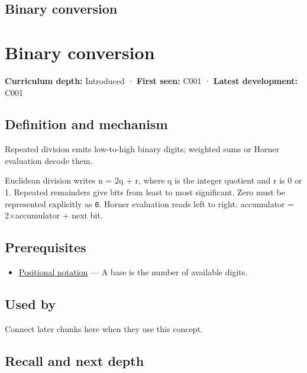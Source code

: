 \hypertarget{appendix-dc552784a2c0}{}
\section*{Binary conversion}
\chapter{Binary conversion}\label{appendix-dc552784a2c0-binary-conversion}

\textbf{Curriculum depth:} Introduced · \textbf{First seen:} C001 · \textbf{Latest development:} C001

\section{Definition and mechanism}\label{appendix-dc552784a2c0-definition-and-mechanism}

Repeated division emits low-to-high binary digits; weighted sums or Horner evaluation decode them.

Euclidean division writes n = 2q + r, where q is the integer quotient and r is 0 or 1. Repeated remainders give bits from least to most significant. Zero must be represented explicitly as \texttt{0}. Horner evaluation reads left to right: accumulator = 2×accumulator + next bit.

\section{Prerequisites}\label{appendix-dc552784a2c0-prerequisites}

\begin{itemize}
\tightlist
\item
  \hyperref[appendix-83c3f28f7bda]{Positional notation} --- A base is the number of available digits.
\end{itemize}

\section{Used by}\label{appendix-dc552784a2c0-used-by}

Connect later chunks here when they use this concept.

\section{Recall and next depth}\label{appendix-dc552784a2c0-recall-and-next-depth}

